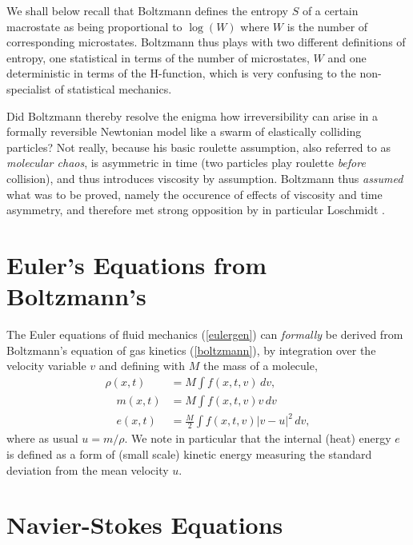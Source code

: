 We shall below recall that Boltzmann defines the entropy $S$ of
a certain macrostate as being proportional to $\log(W)$ where
$W$ is the number of corresponding microstates. Boltzmann
thus plays with two different definitions of entropy, one statistical 
in terms of the number of microstates, $W$ and one deterministic in terms 
of the H-function, which is very confusing to the non-specialist
of statistical mechanics.

Did Boltzmann thereby resolve the enigma
how irreversibility can arise in a formally reversible Newtonian
model like a swarm of elastically colliding  particles? Not really,
because his basic roulette assumption, also referred to as 
\emph{molecular chaos}, is asymmetric in time (two particles
play roulette \emph{before} collision), and thus introduces
viscosity by assumption. Boltzmann thus 
\emph{assumed} what was to be proved, namely the occurence
of effects of viscosity and time asymmetry,
and therefore met strong opposition by in particular Loschmidt 
\cite{loschmidt}.

\section{Euler's Equations from Boltzmann's}

The Euler equations of fluid mechanics (\ref{eulergen}) 
can \emph{formally} be derived from Boltzmann's equation of gas 
kinetics (\ref{boltzmann}), by integration over the velocity variable
$v$ and defining with $M$ the mass of a molecule, 
\begin{equation}
\begin{split}
\rho (x,t)&=M\int f(x,t,v)\, dv,\\ 
\quad m(x,t)&=M\int f(x,t,v)v\, dv\\
\quad e(x,t)&=\frac{M}{2}\int f(x,t,v)\vert v-u\vert^2\, dv,
\end{split}
\end{equation}
where as usual $u=m/\rho$. We note in particular that
the internal (heat) energy $e$ is defined as a form of (small scale) kinetic 
energy measuring the standard deviation from the mean velocity $u$.

\section{Navier-Stokes Equations}


